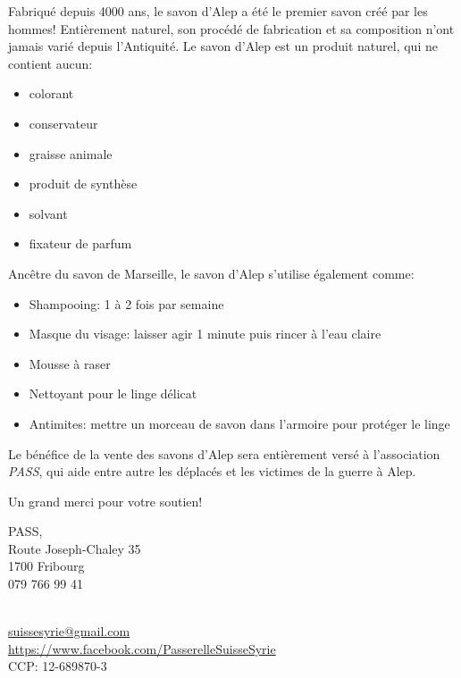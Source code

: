 \documentclass[frenchb,16pt,parskip=half-]{scrartcl}
\begin{document}
Fabriqué depuis 4000 ans,
    le savon d'Alep a été le premier savon créé par les hommes! Entièrement naturel,
    son procédé de fabrication et sa composition n'ont jamais varié depuis l'Antiquité.
\vfill
Le savon d'Alep est un produit naturel, qui ne contient aucun:\\[-1.8em]
\begin{multicols}{3}
    \begin{itemize}
        \item colorant
        \item conservateur
        \item graisse animale
        \item produit de synthèse
        \item solvant
        \item fixateur de parfum
    \end{itemize}
\end{multicols}%
Ancêtre du savon de Marseille, le savon d'Alep s'utilise également comme:
\begin{itemize}
    \item Shampooing: 1 à 2 fois par semaine
    \item Masque du visage: laisser agir 1 minute puis rincer à l'eau  claire
    \item Mousse à raser
    \item Nettoyant pour le linge délicat
    \item Antimites: mettre un morceau de savon dans l'armoire pour protéger le linge
\end{itemize}\vfill
\begin{center}
    Le bénéfice de la vente des savons d'Alep sera entièrement versé à l'association \emph{PASS},
    qui aide entre autre les déplacés et les victimes de la guerre à Alep.

    \vfill
    {\huge Un grand merci pour votre soutien!}
\end{center}
\vfill
\begin{minipage}[t]{.38\linewidth}
    PASS,\\ Route Joseph-Chaley 35\\ 1700 Fribourg\\ 079 766 99 41
\end{minipage}
\begin{minipage}[t]{.6\linewidth}
    ~\\ \url{suissesyrie@gmail.com}\\ \url{https://www.facebook.com/PasserelleSuisseSyrie}\\ CCP: 12-689870-3
\end{minipage}
\end{document}
